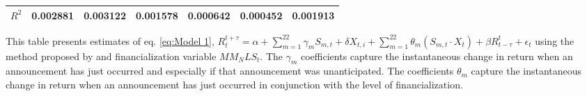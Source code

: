 \begin{sidewaystable}
{\begin{tabular}{@{}lllllllllllll@{}}
                             \\ \textbf{$R^2$}             &\multicolumn{2}{c}{ 0.002881 }                                                 & \multicolumn{2}{c}{ 0.003122 }                                                 & \multicolumn{2}{c}{ 0.001578 }                                                 & \multicolumn{2}{c}{ 0.000642 }                                                 & \multicolumn{2}{c}{ 0.000452 }                                                   & \multicolumn{2}{c}{ 0.001913 }                                                 \\ \bottomrule 
\end{tabular}
}
\begin{tablenotes}\item 
    \singlespacing
    \footnotesize
    This table presents estimates of eq. \ref{eq:Model 1}, $R_{t}^{t+\tau}=\alpha+\sum_{m=1}^{22} \gamma_m S_{m,t}+ \delta X_{t,i} + \sum_{m=1}^{22} \theta_m (S_{m,t} \cdot X_t)+\beta R_{t-\tau}^{t}+\epsilon_{t}$ using the method proposed by \citet{kurov2019price} and financialization variable $MM_NLS_t$. The $\gamma_m$ coefficients capture the instantaneous change in return when an announcement has just occurred and especially if that announcement was unanticipated. The coefficients $\theta_m$ capture the instantaneous change in return when an announcement has just occurred in conjunction with the level of financialization.
\end{tablenotes}
\end{sidewaystable}

